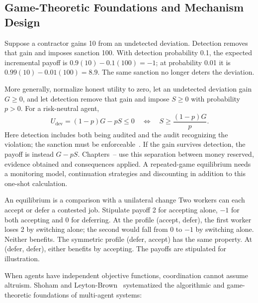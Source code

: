\subsection{Game-Theoretic Foundations and Mechanism Design}

Suppose a contractor gains 10 from an undetected deviation. Detection removes
that gain and imposes sanction 100. With detection probability 0.1, the expected
incremental payoff is $0.9(10)-0.1(100)=-1$; at probability 0.01 it is
$0.99(10)-0.01(100)=8.9$. The same sanction no longer deters the deviation.

More generally, normalize honest utility to zero, let an undetected deviation
gain $G\ge0$, and let detection remove that gain and impose $S\ge0$ with
probability $p>0$. For a risk-neutral agent,
\begin{equation}
U_{\mathrm{dev}}=(1-p)G-pS\le0
\quad\Longleftrightarrow\quad
S\ge\frac{(1-p)G}{p}.
\end{equation}
Here detection includes both being audited and the audit recognizing the
violation; the sanction must be enforceable~. If the gain
survives detection, the payoff is instead $G-pS$. Chapters~-- use this
separation between money reserved, evidence obtained and consequences applied.
A repeated-game equilibrium needs a monitoring model, continuation strategies
and discounting in addition to this one-shot calculation.

\begin{pdexample}{An equilibrium is a comparison with a unilateral change}
Two workers can each accept or defer a contested job. Stipulate payoff 2 for
accepting alone, $-1$ for both accepting and 0 for deferring. At the profile
(accept, defer), the first worker loses 2 by switching alone; the second would
fall from 0 to $-1$ by switching alone. Neither benefits. The symmetric profile
(defer, accept) has the same property. At (defer, defer), either benefits by
accepting. The payoffs are stipulated for illustration.
\end{pdexample}

When agents have independent objective functions, coordination cannot assume altruism. Shoham and Leyton-Brown~ systematized the algorithmic and game-theoretic foundations of multi-agent systems:

